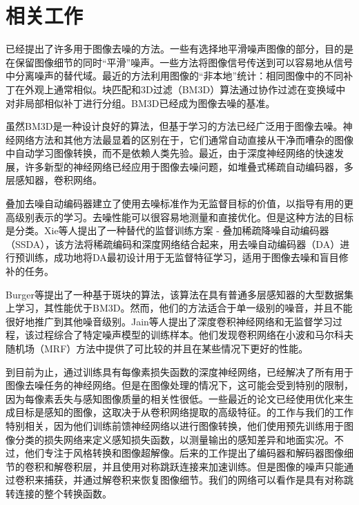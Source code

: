 \section{相关工作}
已经提出了许多用于图像去噪的方法。一些有选择地平滑噪声图像的部分，目的是在保留图像细节的同时“平滑”噪声。一些方法将图像信号传送到可以容易地从信号中分离噪声的替代域。最近的方法利用图像的“非本地”统计：相同图像中的不同补丁在外观上通常相似。块匹配和3D过滤（BM3D）算法\cite{DBLP:journals/tip/DabovFKE07}通过协作过滤在变换域中对非局部相似补丁进行分组。BM3D已经成为图像去噪的基准。

虽然BM3D是一种设计良好的算法，但基于学习的方法已经广泛用于图像去噪。神经网络方法和其他方法最显着的区别在于，它们通常自动直接从干净而嘈杂的图像中自动学习图像转换，而不是依赖人类先验。最近，由于深度神经网络的快速发展，许多新型的神经网络已经应用于图像去噪问题，如堆叠式稀疏自动编码器\cite{DBLP:conf/icml/VincentLBM08,DBLP:conf/nips/XieXC12,Agostinelli2013,Technologii2013a,Skribtsov2016}，多层感知器\cite{Burger2012,Wang2014a}，卷积网络\cite{Jain2009,Wu2014,Zhao2015,Mao2016,Eigen2013,Wu2014relu,Wang2015g}。

叠加去噪自动编码器\cite{DBLP:conf/icml/VincentLBM08}建立了使用去噪标准作为无监督目标的价值，以指导有用的更高级别表示的学习。去噪性能可以很容易地测量和直接优化。但是这种方法的目标是分类。Xie等人提出了一种替代的监督训练方案 - 叠加稀疏降噪自动编码器（SSDA），该方法将稀疏编码和深度网络结合起来，用去噪自动编码器（DA）进行预训练，成功地将DA最初设计用于无监督特征学习，适用于图像去噪和盲目修补的任务。

Burger等\cite{Burger2012}提出了一种基于斑块的算法，该算法在具有普通多层感知器的大型数据集上学习，其性能优于BM3D。然而，他们的方法适合于单一级别的噪音，并且不能很好地推广到其他噪音级别。Jain等人\cite{Jain2009}提出了深度卷积神经网络和无监督学习过程，该过程综合了特定噪声模型的训练样本。他们发现卷积网络在小波和马尔科夫随机场（MRF）方法中提供了可比较的并且在某些情况下更好的性能。

到目前为止，通过训练具有每像素损失函数的深度神经网络，已经解决了所有用于图像去噪任务的神经网络。但是在图像处理的情况下，这可能会受到特别的限制，因为每像素丢失与感知图像质量的相关性很低\cite{Zhao2015}。一些最近的论文已经使用优化来生成目标是感知的图像，这取决于从卷积网络提取的高级特征\cite{Dosovitskiy2016}。\cite{Johnson2016,Mao2016}的工作与我们的工作特别相关，因为他们训练前馈神经网络以进行图像转换，他们使用预先训练用于图像分类的损失网络来定义感知损失函数，以测量输出的感知差异和地面实况。不过，他们专注于风格转换和图像超解像。后来的工作提出了编码器和解码器图像细节的卷积和解卷积层，并且使用对称跳跃连接来加速训练。但是图像的噪声只能通过卷积来捕获，并通过解卷积来恢复图像细节。我们的网络可以看作是具有对称跳转连接的整个转换函数。

